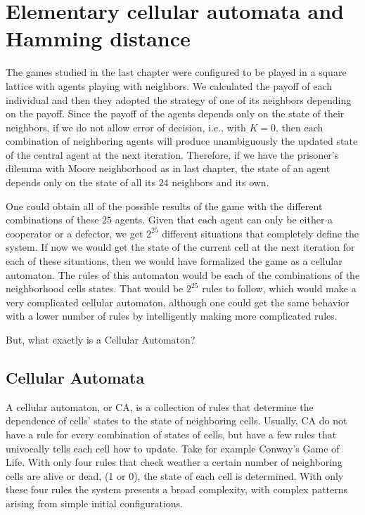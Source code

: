 \chapter{Elementary cellular automata and Hamming distance}
\label{chap:HammingECA}


The games studied in the last chapter were configured to be played in a square lattice with agents playing with neighbors. We calculated the payoff of each individual and then they adopted the strategy of one of its neighbors depending on the payoff. Since the payoff of the agents depends only on the state of their neighbors, if we do not allow error of decision, i.e., with $K=0$, then each combination of neighboring agents will produce unambiguously the updated state of the central agent at the next iteration. Therefore, if we have the prisoner's dilemma with Moore neighborhood as in last chapter, the state of an agent depends only on the state of all its $24$ neighbors and its own. 

One could obtain all of the possible results of the game with the different combinations of these $25$ agents. Given that each agent can only be either a cooperator or a defector, we get $2^{25}$ different situations that completely define the system. If now we would get the state of the current cell at the next iteration for each of these situations, then we would have formalized the game as a cellular automaton. The rules of this automaton would be each of the combinations of the neighborhood cells states. That would be $2^{25}$ rules to follow, which would make a very complicated cellular automaton, although one could get the same behavior with a lower number of rules by intelligently making more complicated rules. 

But, what exactly is a Cellular Automaton?

\section{Cellular Automata}


A cellular automaton, or CA, is a collection of rules that determine the dependence of cells' states to the state of neighboring cells.
Usually, CA do not have a rule for every combination of states of cells, but have a few rules that univocally tells each cell how to update. Take for example Conway's Game of Life. With only four rules that check weather a certain number of neighboring cells are alive or dead, (1 or 0), the state of each cell is determined. With only these four rules the system presents a broad complexity, with complex patterns arising from simple initial configurations. 



